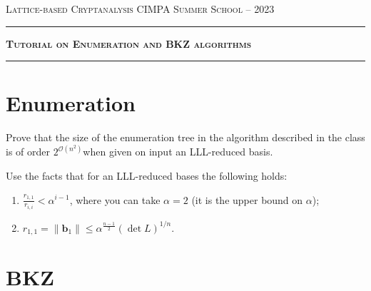 \documentclass[11pt]{exam}
\theoremstyle{definition}
\renewcommand{\vec}{\mathbf}
\begin{document}
{\noindent
   \textsc{Lattice-based Cryptanalysis}
   \hfill {\textsc{CIMPA Summer School -- 2023}}\\
  }
  \hrule
  \begin{center}
    {\Large\textbf{
   \textsc{Tutorial on Enumeration and BKZ algorithms}
    } } 
  \end{center}
  \hrule \vspace{5mm}

\thispagestyle{empty}

\vspace{0.2cm}


\section{Enumeration}

\begin{questions}
\question Prove that the size of the enumeration tree in the algorithm described in the class is of order $2^{\mathcal{O}(n^2)}$when given on input an LLL-reduced basis.

Use the facts that for an LLL-reduced bases the following holds: 
\begin{enumerate}
	\item  $\frac{r_{1,1}}{r_{i,i}} < \alpha^{i-1}$, where you can take $\alpha = 2$ (it is the upper bound on $\alpha$);
	\item $r_{1,1} = \| \vec b_1 \| \leq \alpha^{\frac{n-1}{2}} (\det L)^{1/n}$.
	
\end{enumerate}

\end{questions}

\section{BKZ}
\end{document}
